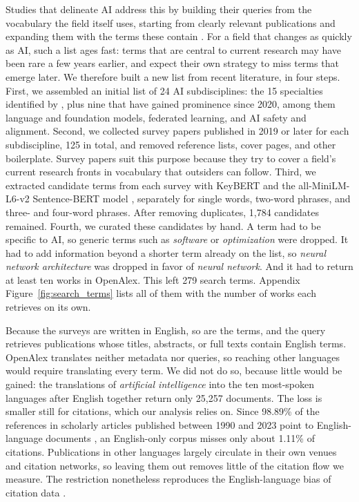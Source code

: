 \documentclass[10pt,twocolumn,a4paper]{article}
\begin{document}
	Studies that delineate AI address this by building their queries from the vocabulary the field itself uses, starting from clearly relevant publications and expanding them with the terms these contain \parencite{baruffaldi2020identifying,liu2021tracking}. For a field that changes as quickly as AI, such a list ages fast: terms that are central to current research may have been rare a few years earlier, and \textcite{liu2021tracking} expect their own strategy to miss terms that emerge later. We therefore built a new list from recent literature, in four steps. First, we assembled an initial list of 24 AI subdisciplines: the 15 specialties identified by \textcite{gargiulo2022cartography}, plus nine that have gained prominence since 2020, among them language and foundation models, federated learning, and AI safety and alignment. Second, we collected survey papers published in 2019 or later for each subdiscipline, 125 in total, and removed reference lists, cover pages, and other boilerplate. Survey papers suit this purpose because they try to cover a field's current research fronts in vocabulary that outsiders can follow. Third, we extracted candidate terms from each survey with KeyBERT and the all-MiniLM-L6-v2 Sentence-BERT model \parencite{reimers2019sentencebert}, separately for single words, two-word phrases, and three- and four-word phrases. After removing duplicates, 1,784 candidates remained. Fourth, we curated these candidates by hand. A term had to be specific to AI, so generic terms such as \textit{software} or \textit{optimization} were dropped. It had to add information beyond a shorter term already on the list, so \textit{neural network architecture} was dropped in favor of \textit{neural network}. And it had to return at least ten works in OpenAlex. This left 279 search terms. Appendix Figure~\ref{fig:search_terms} lists all of them with the number of works each retrieves on its own.
	
	Because the surveys are written in English, so are the terms, and the query retrieves publications whose titles, abstracts, or full texts contain English terms. OpenAlex translates neither metadata nor queries, so reaching other languages would require translating every term. We did not do so, because little would be gained: the translations of \textit{artificial intelligence} into the ten most-spoken languages after English together return only 25,257 documents. The loss is smaller still for citations, which our analysis relies on. Since 98.89\% of the references in scholarly articles published between 1990 and 2023 point to English-language documents \parencite{pradier2025smack}, an English-only corpus misses only about 1.11\% of citations. Publications in other languages largely circulate in their own venues and citation networks, so leaving them out removes little of the citation flow we measure. The restriction nonetheless reproduces the English-language bias of citation data \parencite{dibitetti2017publish}.
	
\end{document}
